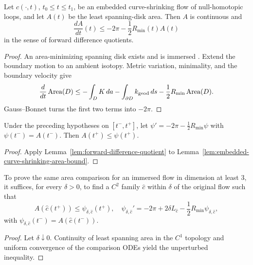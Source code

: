 \begin{lemma}
\label{lem:embedded-curve-shrinking-area-bound}
\label{embcase}
Let $c(\cdot,t)$, $t_0\le t\le t_1$, be an embedded curve-shrinking flow of
null-homotopic loops, and let $A(t)$ be the least spanning-disk area. Then
$A$ is continuous and
\[
\frac{dA}{dt}(t)\le-2\pi-\frac12R_{\min}(t)A(t)
\]
in the sense of forward difference quotients.
\end{lemma}
\begin{proof}
\sketch An area-minimizing spanning disk exists and is immersed
\cite{Hildebrandt,Morrey,HardtSimon,GL}. Extend the boundary motion to an
ambient isotopy. Metric variation, minimality, and the boundary velocity give
\[
\frac d{dt}\operatorname{Area}(D)\le-\int_DK\,da-\int_{\partial D}k_{\mathrm{geod}}\,ds
-\frac12R_{\min}\operatorname{Area}(D).
\]
Gauss--Bonnet turns the first two terms into $-2\pi$.
\end{proof}

\begin{corollary}
\label{cor:embedded-curve-shrinking-area-comparison}
Under the preceding hypotheses on $[t^-,t^+]$, let
$\psi'=-2\pi-\frac12R_{\min}\psi$ with $\psi(t^-)=A(t^-)$. Then
$A(t^+)\le\psi(t^+)$.
\end{corollary}
\begin{proof}
\sketch Apply Lemma~\ref{lem:forward-difference-quotient} to
Lemma~\ref{lem:embedded-curve-shrinking-area-bound}.
\end{proof}

\begin{claim}
\label{claim:curve-shrinking-approximation-suffices}
To prove the same area comparison for an immersed flow in dimension at least
$3$, it suffices, for every $\delta>0$, to find a $C^2$ family $\hat c$ within
$\delta$ of the original flow such that
\[
A(\hat c(t^+))\le\psi_{\delta,\hat c}(t^+),
\quad
\psi_{\delta,\hat c}'=-2\pi+2\delta L_{\hat c}
-\frac12R_{\min}\psi_{\delta,\hat c},
\]
with $\psi_{\delta,\hat c}(t^-)=A(\hat c(t^-))$.
\end{claim}
\begin{proof}
\sketch Let $\delta\downarrow0$. Continuity of least spanning area in the
$C^1$ topology and uniform convergence of the comparison ODEs yield the
unperturbed inequality.
\end{proof}

